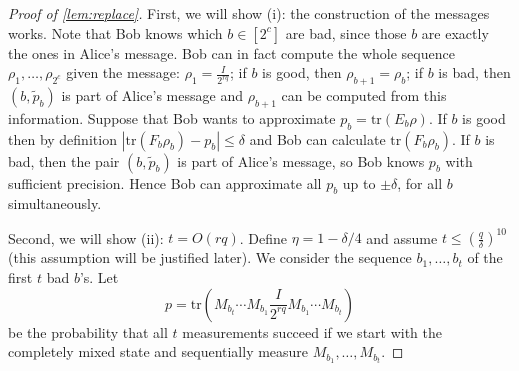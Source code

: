\begin{proof}[Proof of \cref{lem:replace}]
    First, we will show (i): the construction of the messages works. Note that Bob knows which $b\in[2^c]$ are bad, since those $b$ are exactly the ones in Alice's message. Bob can in fact compute the whole sequence $\rho_1,\ldots,\rho_{2^c}$ given the message: $\rho_1=\frac{I}{2^{rq}}$; if $b$ is good, then $\rho_{b+1}=\rho_b$; if $b$ is bad, then $(b,\widetilde{p}_b)$ is part of Alice's message and $\rho_{b+1}$ can be computed from this information. Suppose that Bob wants to approximate $p_b=\mathrm{tr}(E_b\rho)$. If $b$ is good then by definition $|\mathrm{tr}(F_b\rho_b)-p_b| \leq \delta$ and Bob can calculate $\mathrm{tr}(F_b\rho_b)$. If $b$ is bad, then the pair $(b,\widetilde{p}_b)$ is part of Alice's message, so Bob knows $p_b$ with sufficient precision. Hence Bob can approximate all $p_b$ up to $\pm \delta$, for all $b$ simultaneously.

    Second, we will show (ii): $t=O(rq)$. Define $\eta=1-\delta/4$ and assume $t \leq (\frac{q}{\delta})^{10}$ (this assumption will be justified later). We consider the sequence $b_1,\ldots,b_t$ of the first $t$ bad $b$'s.
    Let
    \[
        p=\mathrm{tr} \left( M_{b_t} \cdots M_{b_1} \frac{I}{2^{rq}} M_{b_1} \cdots M_{b_t} \right)
    \]
    be the probability that all $t$ measurements succeed if we start with the completely mixed state and sequentially measure $M_{b_1},\ldots,M_{b_t}$. 


\end{proof}
